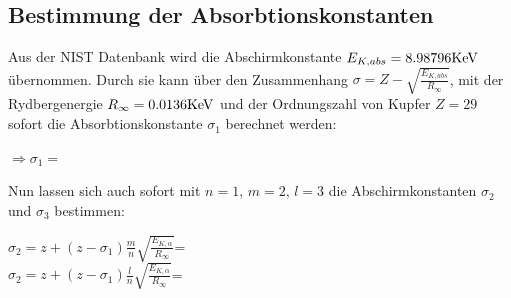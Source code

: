   \subsection{Bestimmung der Absorbtionskonstanten}
  Aus der NIST Datenbank wird die Abschirmkonstante $E_{K,abs}=  8.98796\si[]{KeV}$\\ übernommen. Durch sie kann
  über den Zusammenhang $\sigma=Z-\sqrt{\frac{E_{K,abs}}{R_\infty}}$, mit der Rydbergenergie $R_\infty=0.0136\si[]{KeV}$
  und der Ordnungszahl von Kupfer $Z=29$ sofort die Absorbtionskonstante $\sigma_1$ berechnet werden:
  \begin{center}
    $\Rightarrow \sigma_1=$
  \end{center}
  Nun lassen sich auch sofort mit $n=1$, $m=2$, $l=3$ die Abschirmkonstanten $\sigma_2$ und $\sigma_3$ bestimmen:
  \begin{center}
    $\sigma_2=z+(z-\sigma_1)\frac{m}{n}\sqrt{\frac{E_{K,\alpha}}{R_\infty}}$=\\
    $\sigma_2=z+(z-\sigma_1)\frac{l}{n}\sqrt{\frac{E_{K,\alpha}}{R_\infty}}$=\\
  \end{center}
  